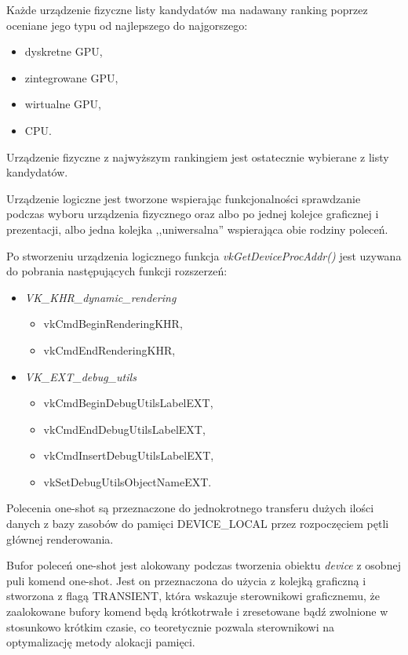 Każde urządzenie fizyczne listy kandydatów ma nadawany ranking poprzez oceniane jego typu od najlepszego do najgorszego:
\begin{itemize}
	\item dyskretne GPU,
	\item zintegrowane GPU,
	\item wirtualne GPU,
	\item CPU.
\end{itemize}
Urządzenie fizyczne z najwyższym rankingiem jest ostatecznie wybierane z listy kandydatów.

Urządzenie logiczne jest tworzone wspierając funkcjonalności sprawdzanie podczas wyboru urządzenia fizycznego oraz albo po jednej kolejce graficznej i prezentacji, albo jedna kolejka ,,uniwersalna'' wspierająca obie rodziny poleceń.

Po stworzeniu urządzenia logicznego funkcja \textit{vkGetDeviceProcAddr()} jest uzywana do pobrania następujących funkcji rozszerzeń:
\begin{itemize}
	\item \textit{VK\_KHR\_dynamic\_rendering}
	\begin{itemize}
		\item vkCmdBeginRenderingKHR,
		\item vkCmdEndRenderingKHR,
	\end{itemize}
	\item \textit{VK\_EXT\_debug\_utils}
	\begin{itemize}
		\item vkCmdBeginDebugUtilsLabelEXT,
		\item vkCmdEndDebugUtilsLabelEXT,
		\item vkCmdInsertDebugUtilsLabelEXT,
		\item vkSetDebugUtilsObjectNameEXT.
	\end{itemize} 
\end{itemize}

Polecenia one-shot są przeznaczone do jednokrotnego transferu dużych ilości danych z bazy zasobów do pamięci DEVICE\_LOCAL przez rozpoczęciem pętli głównej renderowania.


Bufor poleceń one-shot jest alokowany podczas tworzenia obiektu \textit{device} z osobnej puli komend one-shot. Jest on przeznaczona do użycia z kolejką graficzną i stworzona z flagą TRANSIENT, która wskazuje sterownikowi graficznemu, że zaalokowane bufory komend będą krótkotrwałe i zresetowane bądź zwolnione w stosunkowo krótkim czasie, co teoretycznie pozwala sterownikowi na optymalizację metody alokacji pamięci.

